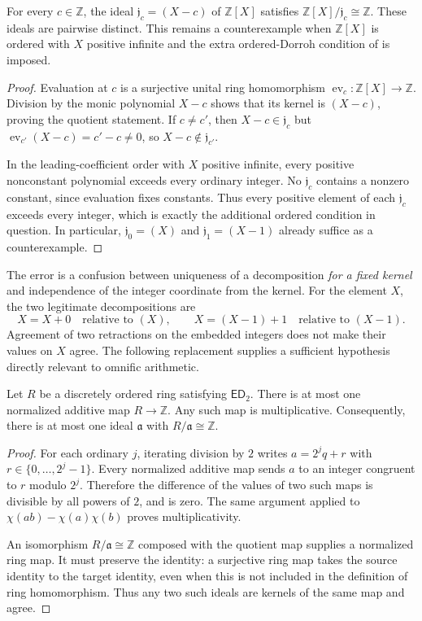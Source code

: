 \documentclass[11pt]{article}
\theoremstyle{definition}
\theoremstyle{remark}
\newcommand{\Z}{\mathbb{Z}}
\newcommand{\ED}{\mathsf{ED}}
\begin{document}
\begin{proposition}\label{isg:sc:prop:correction}
For every $c\in\Z$, the ideal $\mathfrak j_c=(X-c)$ of $\Z[X]$ satisfies
$\Z[X]/\mathfrak j_c\cong\Z$. These ideals are pairwise distinct. This
remains a counterexample when $\Z[X]$ is ordered with $X$ positive infinite
and the extra ordered-Dorroh condition of \cite{ELV} is imposed.
\end{proposition}
\begin{proof}
Evaluation at $c$ is a surjective unital ring homomorphism
$\operatorname{ev}_c:\Z[X]\to\Z$. Division by the monic polynomial $X-c$
shows that its kernel is $(X-c)$, proving the quotient statement. If
$c\ne c'$, then $X-c\in\mathfrak j_c$ but
$\operatorname{ev}_{c'}(X-c)=c'-c\ne0$, so $X-c\notin\mathfrak j_{c'}$.

In the leading-coefficient order with $X$ positive infinite, every positive
nonconstant polynomial exceeds every ordinary integer. No $\mathfrak j_c$
contains a nonzero constant, since evaluation fixes constants. Thus every
positive element of each $\mathfrak j_c$ exceeds every integer, which is
exactly the additional ordered condition in question. In particular,
$\mathfrak j_0=(X)$ and $\mathfrak j_1=(X-1)$ already suffice as a
counterexample.
\end{proof}

The error is a confusion between uniqueness of a decomposition \emph{for a
fixed kernel} and independence of the integer coordinate from the kernel.
For the element $X$, the two legitimate decompositions are
\[
 X=X+0\quad\text{relative to }(X),\qquad
 X=(X-1)+1\quad\text{relative to }(X-1).
\]
Agreement of two retractions on the embedded integers does not make their
values on $X$ agree. The following replacement supplies a sufficient
hypothesis directly relevant to omnific arithmetic.

\begin{proposition}\label{isg:sc:prop:repair}
Let $R$ be a discretely ordered ring satisfying $\ED_2$. There is at most
one normalized additive map $R\to\Z$. Any such map is multiplicative.
Consequently, there is at most one ideal $\mathfrak a$ with
$R/\mathfrak a\cong\Z$.
\end{proposition}
\begin{proof}
For each ordinary $j$, iterating division by $2$ writes $a=2^jq+r$ with
$r\in\{0,\ldots,2^j-1\}$. Every normalized additive map sends $a$ to an
integer congruent to $r$ modulo $2^j$. Therefore the difference of the
values of two such maps is divisible by all powers of $2$, and is zero.
The same argument applied to $\chi(ab)-\chi(a)\chi(b)$ proves
multiplicativity.

An isomorphism $R/\mathfrak a\cong\Z$ composed with the quotient map
supplies a normalized ring map. It must preserve the identity: a
surjective ring map takes the source identity to the target identity, even
when this is not included in the definition of ring homomorphism. Thus any
two such ideals are kernels of the same map and agree.
\end{proof}
\end{document}
